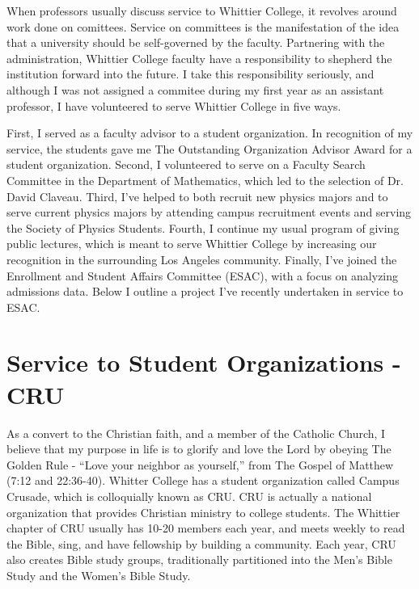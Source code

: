 \documentclass[../main.tex]{subfiles}
\begin{document}
When professors usually discuss service to Whittier College, it revolves around work done on comittees.  Service on committees is the manifestation of the idea that a university should be self-governed by the faculty.  Partnering with the administration, Whittier College faculty have a responsibility to shepherd the institution forward into the future.  I take this responsibility seriously, and although I was not assigned a commitee during my first year as an assistant professor, I have volunteered to serve Whittier College in five ways. \\ \hspace{0.1cm}

First, I served as a faculty advisor to a student organization.  In recognition of my service, the students gave me The Outstanding Organization Advisor Award for a student organization.  Second, I volunteered to serve on a Faculty Search Committee in the Department of Mathematics, which led to the selection of Dr. David Claveau.  Third, I've helped to both recruit new physics majors and to serve current physics majors by attending campus recruitment events and serving the Society of Physics Students.  Fourth, I continue my usual program of giving public lectures, which is meant to serve Whittier College by increasing our recognition in the surrounding Los Angeles community.  Finally, I've joined the Enrollment and Student Affairs Committee (ESAC), with a focus on analyzing admissions data.  Below I outline a project I've recently undertaken in service to ESAC. \\ \hspace{0.1cm}

\section{Service to Student Organizations - CRU}

As a convert to the Christian faith, and a member of the Catholic Church, I believe that my purpose in life is to glorify and love the Lord by obeying The Golden Rule - ``Love your neighbor as yourself,'' from The Gospel of Matthew (7:12 and 22:36-40).  Whitter College has a student organization called Campus Crusade, which is colloquially known as CRU.  CRU is actually a national organization that provides Christian ministry to college students.  The Whittier chapter of CRU usually has 10-20 members each year, and meets weekly to read the Bible, sing, and have fellowship by building a community.  Each year, CRU also creates Bible study groups, traditionally partitioned into the Men's Bible Study and the Women's Bible Study. \\ \hspace{0.1cm}
\end{document}
